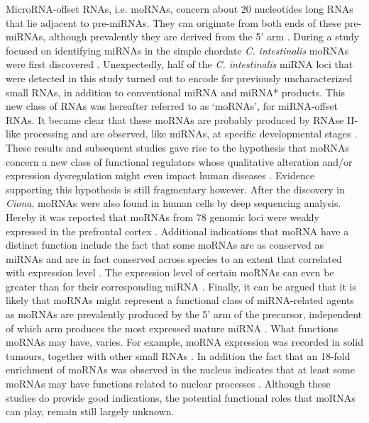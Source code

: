 \documentclass[graybox]{svmult}
\begin{document}
MicroRNA-offset RNAs, i.e. moRNAs, concern about $20$ nucleotides long RNAs 
that lie adjacent to pre-miRNAs. They can originate from both ends of these 
pre-miRNAs, although prevalently they are derived from the 5' arm 
\cite{bortoluzzi2011}. During a study focused on identifying miRNAs in the 
simple chordate \textit{C. intestinalis} moRNAs were first discovered 
\cite{Shi2009}. Unexpectedly, half of the \textit{C. intestinalis} miRNA loci 
that were detected in this study turned out to encode for 
previously uncharacterized small RNAs, in addition to conventional miRNA and 
miRNA* products. This new class of RNAs was hereafter referred to as `moRNAs', 
for miRNA-offset RNAs. It became clear that these moRNAs are probably produced 
by RNAse II-like processing and are observed, like miRNAs, at specific 
developmental stages \cite{Shi2009}.
These results and subsequent studies gave rise to the hypothesis that moRNAs 
concern  a new class of functional regulators whose qualitative alteration 
and/or expression dysregulation might even impact human diseases 
\cite{bortoluzzi2011}. Evidence supporting this hypothesis is still fragmentary 
however. After the discovery in \textit{Ciona}, moRNAs were 
also found in human cells by deep sequencing analysis. Hereby it was reported 
that moRNAs from $78$ genomic loci were weakly expressed in the prefrontal 
cortex \cite{Langenberger2009}. Additional indications that moRNA have a 
distinct function include the fact that some moRNAs are as conserved as miRNAs 
and are in fact conserved across species to an extent that correlated with 
expression level \cite{Shi2009}. The expression level of certain moRNAs can 
even be greater than for their corresponding miRNA \cite{Umbach2010}. Finally, 
it can be argued \cite{bortoluzzi2011} that it is likely that moRNAs might 
represent a functional class of miRNA-related agents as moRNAs are prevalently 
produced by the 5' arm of the precursor, independent of which arm produces the 
most expressed mature miRNA \cite{Langenberger2009, Umbach2010}. 
What functions moRNAs may have, varies. For example, moRNA expression was 
recorded in solid tumours, together with other small RNAs \cite{Meiri2010}. 
In addition the fact that an 18-fold enrichment of moRNAs was observed in the nucleus 
\cite{Taft2010} indicates that at least some moRNAs may have functions related 
to nuclear processes \cite{bortoluzzi2011}. Although these studies do provide 
good indications, the potential functional roles that moRNAs can play, remain 
still largely unknown. 
\end{document}
